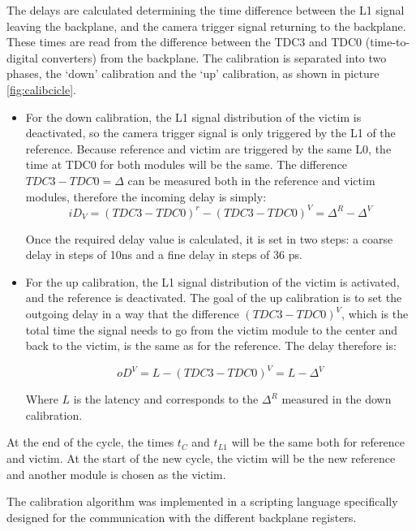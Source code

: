 \documentclass[main.tex]{subfiles}
\begin{document}
The delays are calculated determining the time difference between the L1 signal leaving the backplane, and the camera trigger signal returning to the backplane. These times are read from the difference between the TDC3 and TDC0 (time-to-digital converters) from the backplane. The calibration is separated into two phases, the `down' calibration and the `up' calibration, as shown in picture \ref{fig:calibcicle}.\\

\begin{itemize}

\item For the down calibration, the L1 signal distribution of the victim is deactivated, so the camera trigger signal is only triggered by the L1 of the reference. Because reference and victim are triggered by the same L0, the time at TDC0 for both modules will be the same. The difference $TDC3-TDC0 =\Delta$  can be measured both in the reference and victim modules, therefore the incoming delay is simply:
  \begin{equation}
    iD_{V} = (TDC3-TDC0)^{r}-(TDC3-TDC0)^{V} = \Delta^{R}-\Delta^{V}
  \end{equation}

  Once the required delay value is calculated, it is set in two steps: a coarse delay in steps of 10ns and a fine delay in steps of 36 ps.

\item For the up calibration, the L1 signal distribution of the victim is activated, and the reference is deactivated. The goal of the up calibration is to set the outgoing delay in a way that the difference $(TDC3-TDC0)^V$, which is the total time the signal needs to go from the victim module to the center and back to the victim, is the same as for the reference. The delay therefore is:

  \begin{equation}
    oD^{V} = L - (TDC3-TDC0)^V = L-\Delta^V
  \end{equation}

  Where $L$ is the latency and corresponds to the $\Delta^{R}$ measured in the down calibration.
\end{itemize}

At the end of the cycle, the times $t_C$ and $t_{L1}$ will be the same both for reference and victim. At the start of the new cycle, the victim will be the new reference and another module is chosen as the victim.

The calibration algorithm was implemented in a scripting language specifically designed for the communication with the different backplane registers.
\end{document}

